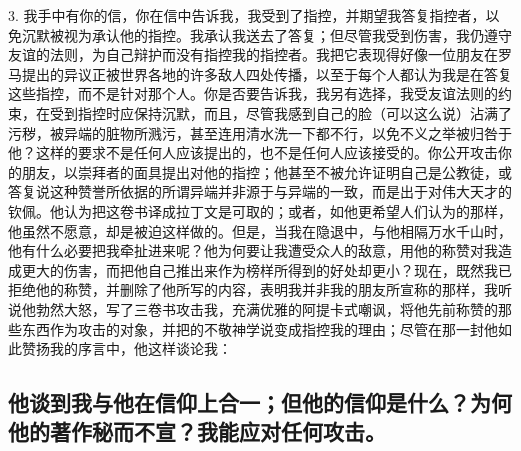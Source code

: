 3. 我手中有你的信，你在信中告诉我，我受到了指控，并期望我答复指控者，以免沉默被视为承认他的指控。我承认我送去了答复；但尽管我受到伤害，我仍遵守友谊的法则，为自己辩护而没有指控我的指控者。我把它表现得好像一位朋友在罗马提出的异议正被世界各地的许多敌人四处传播，以至于每个人都认为我是在答复这些指控，而不是针对那个人。你是否要告诉我，我另有选择，我受友谊法则的约束，在受到指控时应保持沉默，而且，尽管我感到自己的脸（可以这么说）沾满了污秽，被异端的脏物所溅污，甚至连用清水洗一下都不行，以免不义之举被归咎于他？这样的要求不是任何人应该提出的，也不是任何人应该接受的。你公开攻击你的朋友，以崇拜者的面具提出对他的指控；他甚至不被允许证明自己是公教徒，或答复说这种赞誉所依据的所谓异端并非源于与异端的一致，而是出于对伟大天才的钦佩。他认为把这卷书译成拉丁文是可取的；或者，如他更希望人们认为的那样，他虽然不愿意，却是被迫这样做的。但是，当我在隐退中，与他相隔万水千山时，他有什么必要把我牵扯进来呢？他为何要让我遭受众人的敌意，用他的称赞对我造成更大的伤害，而把他自己推出来作为榜样所得到的好处却更小？现在，既然我已拒绝他的称赞，并删除了他所写的内容，表明我并非我的朋友所宣称的那样，我听说他勃然大怒，写了三卷书攻击我，充满优雅的阿提卡式嘲讽，将他先前称赞的那些东西作为攻击的对象，并把的不敬神学说变成指控我的理由；尽管在那一封他如此赞扬我的序言中，他这样谈论我：\par


\subsection{他谈到我与他在信仰上合一；但他的信仰是什么？为何他的著作秘而不宣？我能应对任何攻击。}

